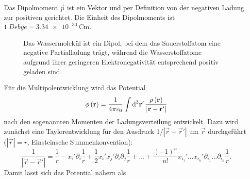 Das Dipolmoment $\vec {p}$ ist ein Vektor und per Definition von der negativen Ladung zur positiven gerichtet. Die Einheit des Dipolmoments ist $\SI{1}{Debye}=\SI{3,34e-30}{\coulomb\m}$.



\begin{figure}[htb]
	\centering
	\tfigWatermolecule
	\caption{Das Wassermolekül ist ein Dipol, bei dem das Sauerstoffatom eine negative Partialladung trägt, während die Wasserstoffatome aufgrund ihrer geringeren Elektronegativität entsprechend positiv geladen sind. }
	\label{fig:water_molecule}
\end{figure}

Für die Multipolentwicklung wird das Potential
\begin{equation*}
	\phi \left(\vec {r}\right)=\frac{1}{4\pi \varepsilon _{0}}\int \diffa[3]{\vec{r}'}\frac{\rho \left(\vec {r}\right)}{\left| \vec {r}-\vec {r}'\right| }
\end{equation*}
nach den sogenannten Momenten der Ladungsverteilung entwickelt. Dazu wird zunächst eine Taylorentwicklung für den Ausdruck $1/\left| \vec {r}-\vec {r}'\right| $ um $\vec {r}$ durchgeführt ($\left| \vec {r}\right| =r$, Einsteinsche Summenkonvention):
\begin{equation*}
	\frac{1}{\left| \vec {r}-\vec {r}'\right| }=\frac{1}{r}-x_{i}'\partial _{i}\frac{1}{r}+\frac{1}{2}x_{i}'x_{j}'\partial _{i}\partial _{j}\frac{1}{r}+\ldots +\frac{\left(-1\right)^{n}}{n!}x_{i_{1}}'\ldots x_{i_{n}}'\partial _{{i_{1}}}\ldots \partial _{{i_{n}}}\frac{1}{r}.
\end{equation*}
Damit lässt sich das Potential nähern als
